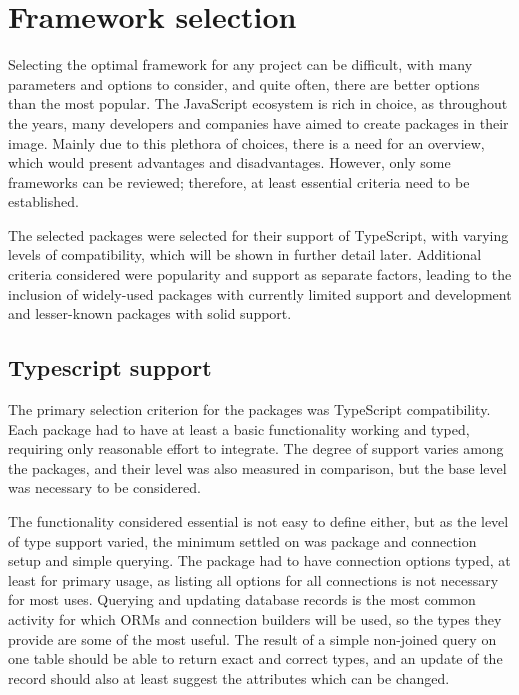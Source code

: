 \chapter{Framework selection}

Selecting the optimal framework for any project can be difficult, with many
parameters and options to consider, and quite often, there are better options
than the most popular. The JavaScript ecosystem is rich in choice, as throughout
the years, many developers and companies have aimed to create packages in their
image. Mainly due to this plethora of choices, there is a need for an overview,
which would present advantages and disadvantages. However, only some frameworks
can be reviewed; therefore, at least essential criteria need to be established. 

The selected packages were selected for their support of TypeScript, with
varying levels of compatibility, which will be shown in further detail later.
Additional criteria considered were popularity and support as separate factors,
leading to the inclusion of widely-used packages with currently limited support
and development and lesser-known packages with solid support. 

\section{Typescript support}
The primary selection criterion for the packages was TypeScript compatibility.
Each package had to have at least a basic functionality working and typed,
requiring only reasonable effort to integrate. The degree of support varies
among the packages, and their level was also measured in comparison, but the
base level was necessary to be considered.

The functionality considered essential is not easy to define either, but as the
level of type support varied, the minimum settled on was package and connection
setup and simple querying. The package had to have connection options typed, at
least for primary usage, as listing all options for all connections is not
necessary for most uses. Querying and updating database records is the most
common activity for which ORMs and connection builders will be used, so the
types they provide are some of the most useful. The result of a simple
non-joined query on one table should be able to return exact and correct types,
and an update of the record should also at least suggest the attributes which
can be changed.

